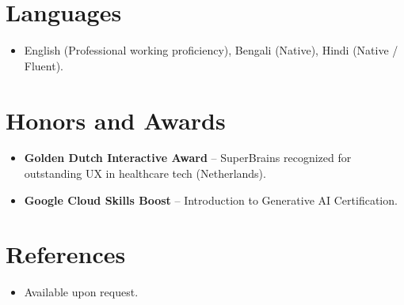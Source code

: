 \documentclass[11pt,a4paper,sans]{moderncv}
\begin{document}

\section{Languages}
\vspace{1pt}
\begin{itemize}
\item {English (Professional working proficiency), Bengali (Native), Hindi (Native / Fluent).}
\end{itemize}


\section{Honors and Awards}
\vspace{1pt}
\begin{itemize}
\item{\textbf{Golden Dutch Interactive Award} -- SuperBrains recognized for outstanding UX in healthcare tech (Netherlands).}
\item{\textbf{Google Cloud Skills Boost} -- Introduction to Generative AI Certification.}
\end{itemize}


\section{References}
\vspace{1pt}
\begin{itemize}
\item{Available upon request.}
\end{itemize}
\end{document}

